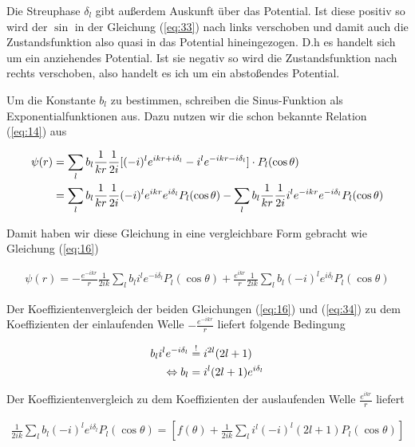 Die Streuphase \(\delta_l\) gibt außerdem Auskunft über das Potential. Ist diese positiv so wird der \(\sin\) in der Gleichung (\ref{eq:33}) nach links verschoben und damit auch die Zustandsfunktion also quasi in das Potential hineingezogen. D.h es handelt sich um ein anziehendes Potential. Ist sie negativ so wird die Zustandsfunktion nach rechts verschoben, also handelt es ich um ein abstoßendes Potential.

Um die Konstante \(b_l\) zu bestimmen, schreiben die Sinus-Funktion als Exponentialfunktionen aus. Dazu nutzen wir die schon bekannte Relation (\ref{eq:14}) aus

\begin{align}
  \label{eq:33}
   \psi(r) &= \sum_l b_l \frac{1}{kr} \frac{1}{2i}[ (-i)^l e^{ikr+i\delta_l} - i^l e^{-ikr-i\delta_l} ]   \cdot P_{l}(\cos\theta) \notag\\
&= \sum_l b_l \frac{1}{kr} \frac{1}{2i} (-i)^l e^{ikr}e^{i\delta_l}P_{l}(\cos\theta) - \sum_l b_l \frac{1}{kr} \frac{1}{2i} i^l e^{-ikr}e^{-i\delta_l}    P_{l}(\cos\theta) 
\end{align}

Damit haben wir diese Gleichung in eine vergleichbare Form gebracht wie Gleichung (\ref{eq:16})

\begin{align}
  \label{eq:34}
 \boxed{ \psi(r) = -  \frac{e^{-ikr}}{r} \frac{1}{2ik}\sum_l b_l  i^l e^{-i\delta_l}    P_{l}(\cos\theta) + \frac{e^{ikr}}{r} \frac{1}{2ik} \sum_l b_l (-i)^l e^{i\delta_l}P_{l}(\cos\theta) }
\end{align}

Der Koeffizientenvergleich der beiden Gleichungen (\ref{eq:16}) und (\ref{eq:34}) zu dem Koeffizienten der einlaufenden Welle \(-  \frac{e^{-ikr}}{r}\) liefert folgende Bedingung

\begin{align}
  \label{eq:35}
   b_l  i^l e^{-i\delta_l} &\stackrel{!}=  i^{2l}(2l+1)\notag\\
\Leftrightarrow b_l &= i^{l}(2l+1)e^{i\delta_l}
\end{align}

Der Koeffizientenvergleich zu dem Koeffizienten der auslaufenden Welle  \( \frac{e^{ikr}}{r}\) liefert

\begin{align}
  \label{eq:36}
\frac{1}{2ik} \sum_l b_l (-i)^l e^{i\delta_l}P_{l}(\cos\theta)  = \left[f(\theta) +  \frac{1}{2ik} \sum_{l}i^l(-i)^l(2l+1) P_l(\cos\theta)\right]
\end{align}

